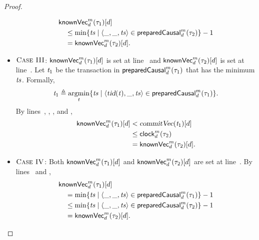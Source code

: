 \begin{proof}
\begin{itemize}
      \begin{align*}
        &{\sf knownVec}^{m}_{d}(\tau_{1})[d] \\
        &\quad \le \min\{\mathit{ts} \mid \langle \_, \_, \mathit{ts} \rangle \in {\sf preparedCausal}^{m}_{d}(\tau_{2})\} - 1 \\
        &\quad = {\sf knownVec}^{m}_{d}(\tau_{2})[d].
      \end{align*}
    \item $\textsc{Case III}$:
      ${\sf knownVec}^{m}_{d}(\tau_{1})[d]$ is set
      at line~\code{\ref{alg:unistore-replication}}{\ref{line:propagate-knownvc-ts}}
      and ${\sf knownVec}^{m}_{d}(\tau_{2})[d]$ is set
      at line~\code{\ref{alg:unistore-replication}}{\ref{line:propagate-knownvc-clock}}.
      Let $\mathit{t}_{1}$ be the transaction in ${\sf preparedCausal}^{m}_{d}(\tau_{1})$
      that has the minimum $\mathit{ts}$. Formally,
      \begin{align*}
        \mathit{t}_{1} \triangleq \operatorname*{argmin}\limits_{\mathit{t}}\{\mathit{ts} \mid \langle \textsl{tid}(\mathit{t}), \_, \mathit{ts} \rangle
          \in {\sf preparedCausal}^{m}_{d}(\tau_{1})\}.
      \end{align*}
      By lines~\code{\ref{alg:unistore-replication}}{\ref{line:propagate-knownvc-ts}},
      \code{\ref{alg:unistore-coord}}{\ref{line:commitcausal-commitvc-d}},
      \code{\ref{alg:unistore-replica}}{\ref{line:commit-wait-clock}},
      and \code{\ref{alg:unistore-replication}}{\ref{line:propagate-knownvc-clock}},
      \begin{align*}
        {\sf knownVec}^{m}_{d}(\tau_{1})[d] &< \textsl{commitVec}(\mathit{t}_{1})[d] \\
          &\le {\sf clock}^{m}_{d}(\tau_{2}) \\
          &= {\sf knownVec}^{m}_{d}(\tau_{2})[d].
      \end{align*}
    \item $\textsc{Case IV}$:
      Both ${\sf knownVec}^{m}_{d}(\tau_{1})[d]$ and ${\sf knownVec}^{m}_{d}(\tau_{2})[d]$ are set
      at line~\code{\ref{alg:unistore-replication}}{\ref{line:propagate-knownvc-ts}}.
      By lines~\code{\ref{alg:unistore-replication}}{\ref{line:propagate-knownvc-ts}}
      and \code{\ref{alg:unistore-replica}}{\ref{line:preparecausal-ts}},
      \begin{align*}
        &{\sf knownVec}^{m}_{d}(\tau_{1})[d] \\
          &\quad = \min\{\mathit{ts} \mid \langle \_, \_, \mathit{ts} \rangle \in {\sf preparedCausal}^{m}_{d}(\tau_{1})\} - 1 \\
          &\quad \le \min\{\mathit{ts} \mid \langle \_, \_, \mathit{ts} \rangle \in {\sf preparedCausal}^{m}_{d}(\tau_{2})\} - 1 \\
          &\quad = {\sf knownVec}^{m}_{d}(\tau_{2})[d].
      \end{align*}
  \end{itemize}
\end{proof}


